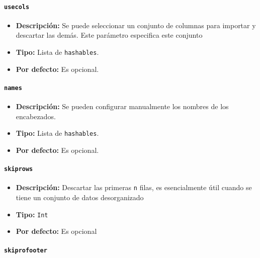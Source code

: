                 \paragraph{\texttt{usecols}}

                    \begin{itemize}
                        \item \textbf{Descripción:} Se puede seleccionar un conjunto de columnas para importar y descartar las demás. Este parámetro especifica este conjunto
                        \item \textbf{Tipo:} Lista de \texttt{hashables}.
                        \item \textbf{Por defecto:} Es opcional.
                    \end{itemize}

                \paragraph{\texttt{names}}

                    \begin{itemize}
                        \item \textbf{Descripción:} Se pueden configurar manualmente los nombres de los encabezados. 
                        \item \textbf{Tipo:} Lista de \texttt{hashables}.
                        \item \textbf{Por defecto:} Es opcional.
                    \end{itemize}

                \paragraph{\texttt{skiprows}}

                    \begin{itemize}
                        \item \textbf{Descripción:} Descartar las primeras \texttt{n} filas, es esencialmente útil cuando se tiene un conjunto de datos desorganizado
                        \item \textbf{Tipo:} \texttt{Int}
                        \item \textbf{Por defecto:} Es opcional
                    \end{itemize}

                \paragraph{\texttt{skiprofooter}}

